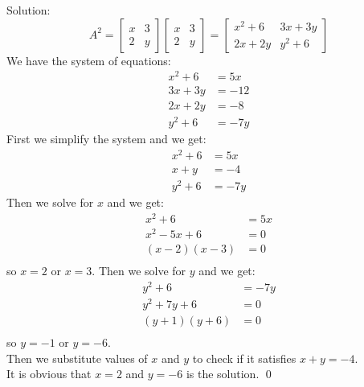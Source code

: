 \documentclass{article}
\theoremstyle{definition}
\begin{document}
Solution:
\[A^2 = 
\begin{bmatrix}
  x & 3 \\
  2 & y
\end{bmatrix}
\begin{bmatrix}
  x & 3 \\
  2 & y
\end{bmatrix}=
\begin{bmatrix}
  x^2+6 & 3x+3y \\
  2x+2y & y^2+6
\end{bmatrix}\]
We have the system of equations:
\begin{align*}
    x^2+6&=5x \\
    3x+3y&=-12 \\
    2x+2y&=-8 \\
    y^2+6&=-7y
\end{align*}
First we simplify the system and we get:
\begin{align*}
    x^2+6&=5x \\
    x+y&=-4 \\
    y^2+6&=-7y
\end{align*}
Then we solve for \(x\) and we get:
\begin{align*}
    x^2+6&=5x \\
    x^2-5x+6&=0 \\
    (x-2)(x-3)&=0 \\
\end{align*}
so \(x=2\) or \(x=3\).
Then we solve for \(y\) and we get:
\begin{align*}
    y^2+6&=-7y \\
    y^2+7y+6&=0 \\
    (y+1)(y+6)&=0 \\
\end{align*}
so \(y=-1\) or \(y=-6\). \\
Then we substitute values of \(x\) and \(y\) to check if it satisfies \(x+y=-4\).\\
It is obvious that \(x=2\) and \(y=-6\) is the solution. \qed
\end{document}
